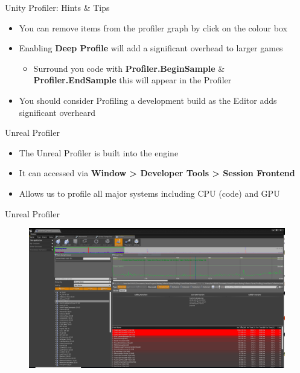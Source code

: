 \begin{frame}{Unity Profiler: Hints \& Tips}
	\begin{itemize}
		\pause \item You can remove items from the profiler graph by click on the colour box
		\pause \item Enabling \textbf{Deep Profile} will add a significant overhead to larger games
		\begin{itemize}
			\pause \item Surround you code with \textbf{Profiler.BeginSample} \& \textbf{Profiler.EndSample} this will appear in the Profiler
		\end{itemize}
		\pause \item You should consider Profiling a development build as the Editor adds significant overheard
	\end{itemize}
\end{frame}

\begin{frame}{Unreal Profiler}
	\begin{itemize}
		\pause \item The Unreal Profiler is built into the engine
		\pause \item It can accessed via \textbf{Window > Developer Tools > Session Frontend}
		\pause \item Allows us to profile all major systems including CPU (code) and GPU
	\end{itemize}
\end{frame}

\begin{frame}{Unreal Profiler}
	\begin{figure}
		\includegraphics[width=1.0\textwidth,height=0.8\textheight]{UnrealProfilerWindow}  
	\end{figure}
\end{frame}

